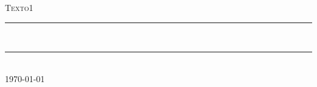 \thispagestyle{empty}
\begin{center}
    \hspace{0pt}
    \vfill
    \normalsize \textsc{Texto1}
    \\ [1.0cm]
    \rule{\linewidth}{0.5pt} \\
    \LARGE \textbf{\uppercase{\writeTitle}}
    \rule{\linewidth}{2pt} \\ [0.5cm]

    \vspace{15px}\normalsize \today

    \vspace{30px}
    {
        \Large
        \printAuthor
    }

    \vfill
    \hspace{0pt}
\end{center}